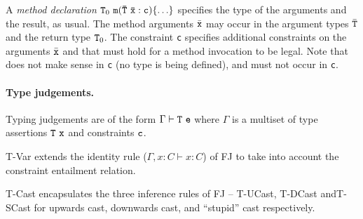 A {\em method declaration} ${\tt T}_0\ {\tt m(\bar{\tt T}\ \bar{\tt x} :
c)\{\ldots\}}$ specifies the type of the arguments and the result, as
usual.  The method arguments $\bar{\tt x}$ may occur in the argument
types $\bar{\tt T}$ and the return type ${\tt T}_0$.  The constraint
{\tt c} specifies additional constraints on the arguments $\bar{\tt
x}$ and
\this{} that must hold for a method invocation to be legal. Note that
\self{} does not make sense in {\tt c} (no type is being defined), and must not occur in {\tt c}.

\paragraph{Type judgements.}
Typing judgements are of the form $\Gamma \vdash {\tt T}\ {\tt e}$
where $\Gamma$ is a multiset of type assertions ${\tt T}\ {\tt x}$ and
constraints ${\tt c}$. 

\def\TConstr{\mbox{\sc T-Constr}}
\def\TInv{\mbox{\sc T-Inv}}
\def\TVar{\mbox{\sc T-Var}}
\def\TField{\mbox{\sc T-Field}}
\def\TInvk{\mbox{\sc T-Invk}}
\def\TNew{\mbox{\sc T-New}}
\def\TCast{\mbox{\sc T-Cast}}
\def\TUCast{\mbox{\sc T-UCast}}
\def\TDCast{\mbox{\sc T-DCast}}
\def\TSCast{\mbox{\sc T-SCast}}

\TVar{} extends the identity rule ($\Gamma, x:C \vdash x:C$) of {\sf FJ} to take into account the constraint entailment relation.

\TCast{} encapsulates the three inference rules of {\sf FJ} -- 
\TUCast{}, \TDCast{} and\TSCast{} for upwards cast, downwards cast, and ``stupid'' cast respectively. 

